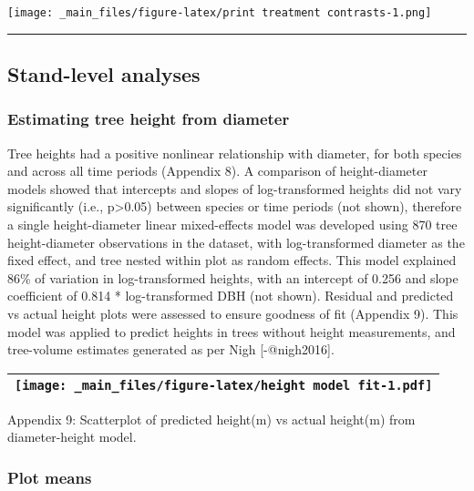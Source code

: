 \documentclass[
]{article}
\begin{document}
\texttt{[image: \_main\_files/figure-latex/print treatment contrasts-1.png]}

\begin{center}\rule{0.5\linewidth}{0.5pt}\end{center}

\hypertarget{stand-level-analyses}{%
\subsection{Stand-level analyses}\label{stand-level-analyses}}

\hypertarget{estimating-tree-height-from-diameter}{%
\subsubsection{Estimating tree height from diameter}\label{estimating-tree-height-from-diameter}}

Tree heights had a positive nonlinear relationship with diameter, for both species and across all time periods (Appendix 8). A comparison of height-diameter models showed that intercepts and slopes of log-transformed heights did not vary significantly (i.e., p\textgreater{}0.05) between species or time periods (not shown), therefore a single height-diameter linear mixed-effects model was developed using 870 tree height-diameter observations in the dataset, with log-transformed diameter as the fixed effect, and tree nested within plot as random effects. This model explained 86\% of variation in log-transformed heights, with an intercept of 0.256 and slope coefficient of 0.814 * log-transformed DBH (not shown). Residual and predicted vs actual height plots were assessed to ensure goodness of fit (Appendix 9). This model was applied to predict heights in trees without height measurements, and tree-volume estimates generated as per Nigh {[}-@nigh2016{]}.

\begin{longtable}[]{@{}l@{}}
\toprule
\endhead
\begin{minipage}[t]{0.39\columnwidth}\raggedright
\texttt{[image: \_main\_files/figure-latex/height model fit-1.pdf]}\strut
\end{minipage}\tabularnewline
\bottomrule
\end{longtable}

Appendix 9: Scatterplot of predicted height(m) vs actual height(m) from diameter-height model.

\hypertarget{plot-means}{%
\subsubsection{Plot means}\label{plot-means}}
\end{document}
